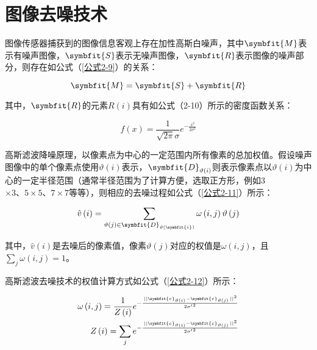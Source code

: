 \section{图像去噪技术}


图像传感器捕获到的图像信息客观上存在加性高斯白噪声，其中$\symbfit{M}$表示有噪声图像，$\symbfit{S}$表示无噪声图像，$\symbfit{R}$表示图像的噪声部分，则存在如公式（\ref{公式2-9}）的关系：


\begin{equation}\label{公式2-9}
	\symbfit{M}=\symbfit{S}+\symbfit{R}
\end{equation}

其中，$\symbfit{R}$的元素$R\left(i\right)$具有如公式（2-10）所示的密度函数关系：

\begin{equation}\label{公式2-10}
	f\left(x\right)=\frac{1}{\sqrt{2\pi}\sigma}e^{-\frac{x^2}{2\sigma^2}}
\end{equation}


高斯滤波降噪原理，以像素点为中心的一定范围内所有像素的总加权值。假设噪声图像中的单个像素点使用$\vartheta\left(i\right)$表示，$\symbfit{D}_{\vartheta\left(i\right)}$则表示像素点以$\vartheta\left(i\right)$为中心的一定半径范围（通常半径范围为了计算方便，选取正方形，例如3$\times3、5\times5、7\times7$等等），则相应的去噪过程如公式（\ref{公式2-11}）所示：

\begin{equation}\label{公式2-11}
	\hat{v}\left(i\right)=\sum_{\vartheta\left(j\right)\in\symbfit{D}_{\vartheta\left(\symbfit{i}\right)}}\omega\left(i,j\right)\vartheta\left(j\right)
\end{equation}

其中，$\hat{v}\left(i\right)$是去噪后的像素值，像素$\vartheta\left(j\right)$对应的权值是$\omega\left(i,j\right)$，且$\sum_{j}\omega\left(i,j\right)=1$。

高斯滤波去噪技术的权值计算方式如公式（\ref{公式2-12}）所示：


\begin{equation}
	\begin{split}\label{公式2-12}
		{\omega}\left(i,j\right)=\frac{1}{Z\left(i\right)}e^{-\frac{\left.|{|\symbfit{c}}_{\vartheta\left(i\right)}-\symbfit{c}_{\vartheta\left(j\right)}\right.{||}^2}{2{\sigma^\prime}^2}}\\
		Z\left(i\right)=\sum_{j} e^{-\frac{\left.|{|\symbfit{c}}_{\vartheta\left(i\right)}-\symbfit{c}_{\vartheta\left(j\right)}\right.{||}^2}{2{\sigma^\prime}^2}}
	\end{split}
\end{equation}



